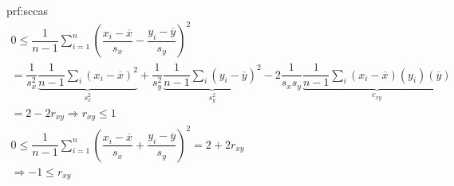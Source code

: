 \par\bigskip
\begin{prf}{prf:sccas}
  \begin{equation*}
    \begin{gathered}
      0\leq \dfrac{1}{n-1}\sum_{i=1}^{n}\left(\dfrac{x_i-\overline{x}}{s_x}-\dfrac{y_i-\overline{y}}{s_y}\right)^2\\
      = \dfrac{1}{s_x^2}\underbrace{\dfrac{1}{n-1}\sum_{i}\left(x_i-\overline{x}\right)^2}_{\text{$s_x^2$}}+\dfrac{1}{s_y^2}\underbrace{\dfrac{1}{n-1}\sum_{i}(y_i-\overline{y})^2}_{\text{$s_y^2$}}-2\dfrac{1}{s_xs_y}\underbrace{\dfrac{1}{n-1}\sum_{i}(x_i-\overline{x})(y_i)(\overline{y})}_{\text{$c_{xy}$}}\\
      = 2-2r_{xy}\Rightarrow r_{xy}\leq1\\
      0\leq\dfrac{1}{n-1}\sum_{i=1}^{n}\left(\dfrac{x_i-\overline{x}}{s_x}+\dfrac{y_i-\overline{y}}{s_y}\right)^2 = 2+2r_{xy}\\
      \Rightarrow -1\leq r_{xy}
    \end{gathered}
  \end{equation*}
\end{prf}
